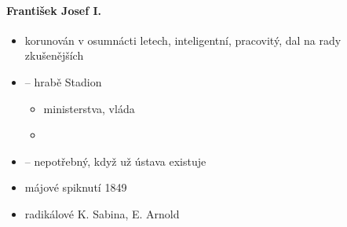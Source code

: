 \paragraph{František Josef I.}
\begin{itemize}
\item korunován v osumnácti letech, inteligentní, pracovitý, dal na rady zkušenějších
\item {} -- hrabě Stadion
	\begin{itemize}
	\item ministerstva, vláda
	\item 
	\end{itemize}
\item {} -- nepotřebný, když už ústava existuje
\item májové spiknutí 1849
\item radikálové K. Sabina, E. Arnold
\end{itemize}

